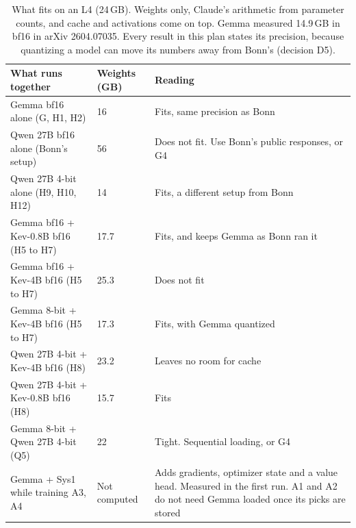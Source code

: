\documentclass[10pt]{article}
\begin{document}
\begin{table}[H]
\footnotesize
\caption{What fits on an L4 (24\,GB). Weights only, Claude's arithmetic from parameter counts, and cache and activations come on top. Gemma measured 14.9\,GB in bf16 in arXiv 2604.07035. Every result in this plan states its precision, because quantizing a model can move its numbers away from Bonn's (decision D5).}
\label{t:fit}
\begin{tabularx}{\linewidth}{@{}P{7.5cm} P{2.5cm} L@{}}
\toprule
What runs together & Weights (GB) & Reading \\
\midrule
Gemma bf16 alone (G, H1, H2) & 16 & Fits, same precision as Bonn \\
Qwen 27B bf16 alone (Bonn's setup) & 56 & Does not fit. Use Bonn's public responses, or G4 \\
Qwen 27B 4-bit alone (H9, H10, H12) & 14 & Fits, a different setup from Bonn \\
Gemma bf16 + Kev-0.8B bf16 (H5 to H7) & 17.7 & Fits, and keeps Gemma as Bonn ran it \\
Gemma bf16 + Kev-4B bf16 (H5 to H7) & 25.3 & Does not fit \\
Gemma 8-bit + Kev-4B bf16 (H5 to H7) & 17.3 & Fits, with Gemma quantized \\
Qwen 27B 4-bit + Kev-4B bf16 (H8) & 23.2 & Leaves no room for cache \\
Qwen 27B 4-bit + Kev-0.8B bf16 (H8) & 15.7 & Fits \\
Gemma 8-bit + Qwen 27B 4-bit (Q5) & 22 & Tight. Sequential loading, or G4 \\
Gemma + Sys1 while training A3, A4 & Not computed & Adds gradients, optimizer state and a value head. Measured in the first run. A1 and A2 do not need Gemma loaded once its picks are stored \\
\bottomrule
\end{tabularx}
\end{table}
\end{document}
